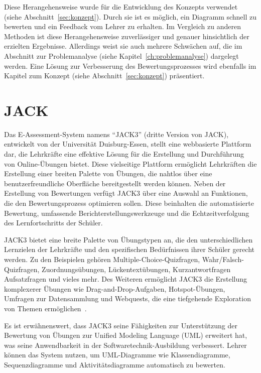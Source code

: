 Diese Herangehensweise wurde für die Entwicklung des Konzepts verwendet (siehe Abschnitt~\ref{sec:konzept}). Durch sie
ist es möglich, ein Diagramm schnell zu bewerten und ein Feedback vom Lehrer zu erhalten. Im Vergleich zu anderen
Methoden ist diese Herangehensweise zuverlässiger und genauer hinsichtlich der erzielten Ergebnisse. Allerdings weist
sie auch mehrere Schwächen auf, die im Abschnitt zur Problemanalyse (siehe Kapitel~\ref{ch:problemanalyse}) dargelegt
werden. Eine Lösung zur Verbesserung des Bewertungsprozesses wird ebenfalls im Kapitel zum Konzept
(siehe Abschnitt~\ref{sec:konzept}) präsentiert.


\section{JACK}

Das E-Assessment-System namens ``JACK3'' (dritte Version von JACK)\cite{jack}, entwickelt von der Universität
Duisburg-Essen, stellt eine webbasierte Plattform dar, die Lehrkräfte eine effektive Lösung für die Erstellung und
Durchführung von Online-Übungen bietet. Diese vielseitige Plattform ermöglicht Lehrkräften die Erstellung einer breiten
Palette von Übungen, die nahtlos über eine benutzerfreundliche Oberfläche bereitgestellt werden können. Neben der
Erstellung von Bewertungen verfügt JACK3 über eine Auswahl an Funktionen, die den Bewertungsprozess optimieren sollen.
Diese beinhalten die automatisierte Bewertung, umfassende Berichterstellungswerkzeuge und die Echtzeitverfolgung des
Lernfortschritts der Schüler.

JACK3 bietet eine breite Palette von Übungstypen an, die den unterschiedlichen Lernzielen der Lehrkräfte und den
spezifischen Bedürfnissen ihrer Schüler gerecht werden. Zu den Beispielen gehören Multiple-Choice-Quizfragen,
Wahr/Falsch-Quizfragen, Zuordnungsübungen, Lückentextübungen, Kurzantwortfragen Aufsatzfragen und vieles mehr. Des
Weiteren ermöglicht JACK3 die Erstellung komplexerer Übungen wie Drag-and-Drop-Aufgaben, Hotspot-Übungen, Umfragen zur
Datensammlung und Webquests, die eine tiefgehende Exploration von Themen ermöglichen~\cite{jack}.

Es ist erwähnenswert, dass JACK3 seine Fähigkeiten zur Unterstützung der Bewertung von Übungen zur Unified Modeling
Language (UML) erweitert hat, was seine Anwendbarkeit in der Softwaretechnik-Ausbildung verbessert. Lehrer können das
System nutzen, um UML-Diagramme wie Klassendiagramme, Sequenzdiagramme und Aktivitätsdiagramme automatisch zu bewerten.

